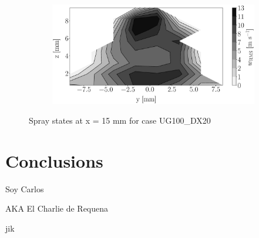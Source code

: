 \begin{figure}[h!]
\begin{subfigure}[b]{0.22\textwidth}
\end{subfigure}
   \hspace{0.17in}
\begin{subfigure}[b]{0.22\textwidth}
	\centering
   \includegraphics[scale=0.17]{./part2_developments/figures_ch5_resolved_JICF/injectors_SLI/uG100_dx20_x15_uz_rms_map.eps}
\end{subfigure}
\caption{Spray states at x = 15 mm for case UG100\_DX20}
\label{fig:injectors_sli_uG100_dx20_x15}
\end{figure}


\clearpage

\section{Conclusions}

Soy Carlos

AKA El Charlie de Requena

jik